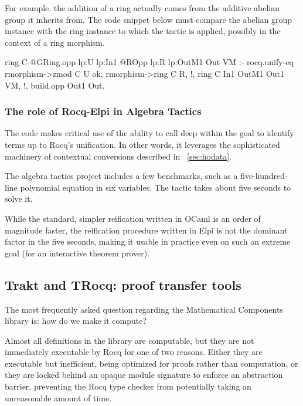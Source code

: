 \documentclass{these-ISSS}
\newenvironment{elpicode}
  {\VerbatimEnvironment\begin{elpibox}\begin{xelpicode}}{\end{xelpicode}
\end{elpibox}}
\begin{document}
For example, the addition of a ring actually comes from the additive abelian
group it inherits from. The code snippet below must compare the abelian group
instance  with the ring instance  to which the tactic is
applied, possibly in the context  of a ring morphism.

\begin{elpicode}
ring C {{ @GRing.opp lp:U lp:In1 }} {{ @ROpp lp:R lp:OutM1 }} Out VM :-
  rocq.unify-eq { rmorphism->zmod C } U ok,
  rmorphism->ring C R, !,
  ring C In1 OutM1 Out1 VM, !,
  build.opp Out1 Out.  
\end{elpicode}

\subsubsection{The role of Rocq-Elpi in Algebra Tactics}


The code makes critical use of the ability to call  deep
within the goal to identify terms up to Rocq's unification. In other words, it
leverages the sophisticated machinery of contextual conversions described in
~\cref{sec:hodata}.

The algebra tactics project includes a few benchmarks, such as a
five-hundred-line polynomial equation in six variables. The  tactic takes about
five seconds to solve it.

While the standard, simpler reification written in OCaml is an order of
magnitude faster, the reification procedure written in Elpi is not the dominant
factor in the five seconds, making it usable in practice even on such an
extreme goal (for an interactive theorem prover).


\subsection{Trakt and TRocq: proof transfer tools}


The most frequently asked question regarding the Mathematical Components
library is: how do we make it compute?

Almost all definitions in the library are computable, but they are not
immediately executable by Rocq for one of two reasons. Either they are
executable but inefficient, being optimized for proofs rather than
computation, or they are locked behind an opaque module signature to enforce
an abstraction barrier, preventing the Rocq type checker from potentially
taking an unreasonable amount of time.
\end{document}
